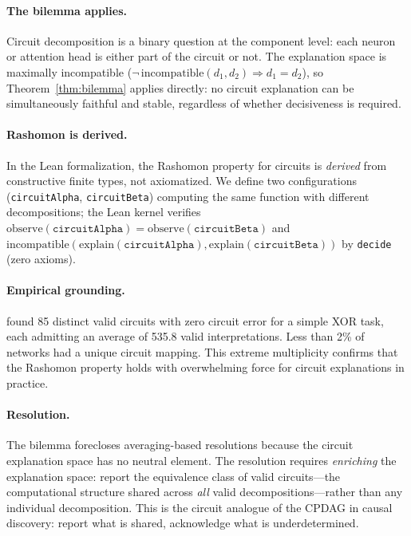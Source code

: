 \documentclass{article}
\begin{document}
\paragraph{The bilemma applies.}
Circuit decomposition is a binary question at the component level:
each neuron or attention head is either part of the circuit or not.
The explanation space is maximally incompatible
($\neg\,\mathrm{incompatible}(d_1, d_2) \Rightarrow d_1 = d_2$),
so Theorem~\ref{thm:bilemma} applies directly: no circuit explanation
can be simultaneously faithful and stable, regardless of whether
decisiveness is required.

\paragraph{Rashomon is derived.}
In the Lean formalization, the Rashomon property for circuits is
\emph{derived} from constructive finite types, not axiomatized.
We define two configurations (\texttt{circuitAlpha},
\texttt{circuitBeta}) computing the same function with different
decompositions; the Lean kernel verifies
$\mathrm{observe}(\texttt{circuitAlpha}) =
\mathrm{observe}(\texttt{circuitBeta})$ and
$\mathrm{incompatible}(\mathrm{explain}(\texttt{circuitAlpha}),
\mathrm{explain}(\texttt{circuitBeta}))$
by \texttt{decide} (zero axioms).

\paragraph{Empirical grounding.}
\citet{meloux2025circuits} found 85 distinct valid circuits with zero
circuit error for a simple XOR task, each admitting an average of 535.8
valid interpretations.
Less than 2\% of networks had a unique circuit mapping.
This extreme multiplicity confirms that the Rashomon property holds with
overwhelming force for circuit explanations in practice.

\paragraph{Resolution.}
The bilemma forecloses averaging-based resolutions because the circuit
explanation space has no neutral element.
The resolution requires \emph{enriching} the explanation space: report the
equivalence class of valid circuits---the computational structure shared
across \emph{all} valid decompositions---rather than any individual
decomposition.
This is the circuit analogue of the CPDAG in causal discovery: report what
is shared, acknowledge what is underdetermined.
\end{document}
